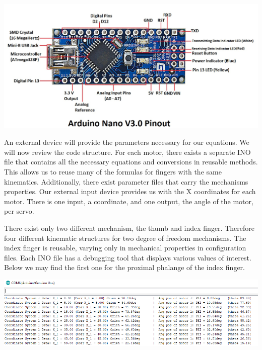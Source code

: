 \documentclass{article}
\begin{document}
\begin{center}
\includegraphics[width=\textwidth]{IMG/Nano.png}
\end{center}

An external device will provide the parameters necessary for our equations. We will  now review the code structure. For each motor, there exists a separate INO file that contains all the necessary equations and conversions in reusable methods. This allows us to reuse many of the formulas for fingers with the same kinematics. Additionally, there exist parameter files that carry the mechanisms properties. Our external input device provides us with the X coordinates for each motor. There is one input, a coordinate, and one output, the angle of the motor, per servo.

There exist only two different mechanism, the thumb and index finger. Therefore four different kinematic structures for two degree of freedom mechanisms. The index finger is reusable, varying only in mechanical properties in configuration files. Each INO file has a debugging tool that displays various values of interest. Below we may find the first one for the proximal phalange of the index finger.

\begin{center}
\includegraphics[width=\textwidth]{IMG/IK_02.png}
\end{center}
\end{document}
